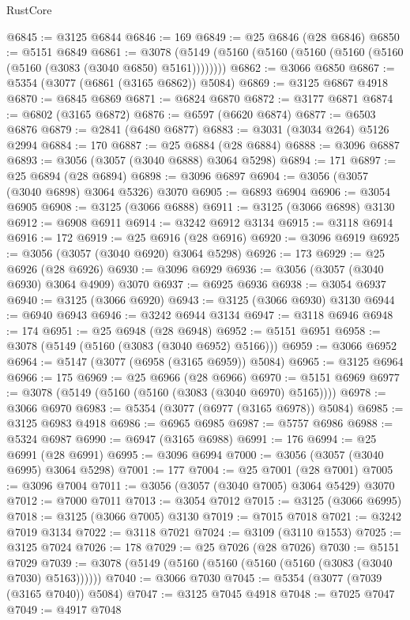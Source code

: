 \begin{lexlean}{RustCore}
\begin{coremodule}
@6845 := @3125 @6844
@6846 := 169
@6849 := @25 @6846 (@28 @6846)
@6850 := @5151 @6849
@6861 := @3078 (@5149 (@5160 (@5160 (@5160 (@5160 (@5160 (@5160 (@3083 (@3040 @6850) @5161))))))))
@6862 := @3066 @6850
@6867 := @5354 (@3077 (@6861 (@3165 @6862)) @5084)
@6869 := @3125 @6867 @4918
@6870 := @6845 @6869
@6871 := @6824 @6870
@6872 := @3177 @6871
@6874 := @6802 (@3165 @6872)
@6876 := @6597 (@6620 @6874)
@6877 := @6503 @6876
@6879 := @2841 (@6480 @6877)
@6883 := @3031 (@3034 @264) @5126 @2994
@6884 := 170
@6887 := @25 @6884 (@28 @6884)
@6888 := @3096 @6887
@6893 := @3056 (@3057 (@3040 @6888) @3064 @5298)
@6894 := 171
@6897 := @25 @6894 (@28 @6894)
@6898 := @3096 @6897
@6904 := @3056 (@3057 (@3040 @6898) @3064 @5326) @3070
@6905 := @6893 @6904
@6906 := @3054 @6905
@6908 := @3125 (@3066 @6888)
@6911 := @3125 (@3066 @6898) @3130
@6912 := @6908 @6911
@6914 := @3242 @6912 @3134
@6915 := @3118 @6914
@6916 := 172
@6919 := @25 @6916 (@28 @6916)
@6920 := @3096 @6919
@6925 := @3056 (@3057 (@3040 @6920) @3064 @5298)
@6926 := 173
@6929 := @25 @6926 (@28 @6926)
@6930 := @3096 @6929
@6936 := @3056 (@3057 (@3040 @6930) @3064 @4909) @3070
@6937 := @6925 @6936
@6938 := @3054 @6937
@6940 := @3125 (@3066 @6920)
@6943 := @3125 (@3066 @6930) @3130
@6944 := @6940 @6943
@6946 := @3242 @6944 @3134
@6947 := @3118 @6946
@6948 := 174
@6951 := @25 @6948 (@28 @6948)
@6952 := @5151 @6951
@6958 := @3078 (@5149 (@5160 (@3083 (@3040 @6952) @5166)))
@6959 := @3066 @6952
@6964 := @5147 (@3077 (@6958 (@3165 @6959)) @5084)
@6965 := @3125 @6964
@6966 := 175
@6969 := @25 @6966 (@28 @6966)
@6970 := @5151 @6969
@6977 := @3078 (@5149 (@5160 (@5160 (@3083 (@3040 @6970) @5165))))
@6978 := @3066 @6970
@6983 := @5354 (@3077 (@6977 (@3165 @6978)) @5084)
@6985 := @3125 @6983 @4918
@6986 := @6965 @6985
@6987 := @5757 @6986
@6988 := @5324 @6987
@6990 := @6947 (@3165 @6988)
@6991 := 176
@6994 := @25 @6991 (@28 @6991)
@6995 := @3096 @6994
@7000 := @3056 (@3057 (@3040 @6995) @3064 @5298)
@7001 := 177
@7004 := @25 @7001 (@28 @7001)
@7005 := @3096 @7004
@7011 := @3056 (@3057 (@3040 @7005) @3064 @5429) @3070
@7012 := @7000 @7011
@7013 := @3054 @7012
@7015 := @3125 (@3066 @6995)
@7018 := @3125 (@3066 @7005) @3130
@7019 := @7015 @7018
@7021 := @3242 @7019 @3134
@7022 := @3118 @7021
@7024 := @3109 (@3110 @1553)
@7025 := @3125 @7024
@7026 := 178
@7029 := @25 @7026 (@28 @7026)
@7030 := @5151 @7029
@7039 := @3078 (@5149 (@5160 (@5160 (@5160 (@5160 (@3083 (@3040 @7030) @5163))))))
@7040 := @3066 @7030
@7045 := @5354 (@3077 (@7039 (@3165 @7040)) @5084)
@7047 := @3125 @7045 @4918
@7048 := @7025 @7047
@7049 := @4917 @7048

\end{coremodule}
\end{lexlean}

